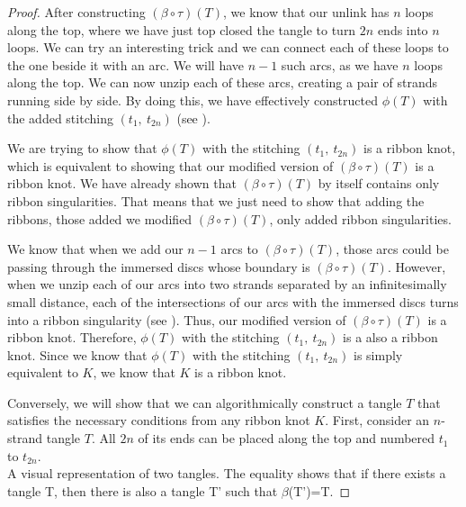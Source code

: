 \begin{paper}
\begin{proof}
After constructing $(\beta\circ\tau)(T)$, we know that our unlink has $n$ loops
along the top, where we have just top closed the tangle to turn $2n$ ends into
$n$ loops.
We can try an interesting trick and we can connect each of these loops to the
one beside it with an arc.
We will have $n-1$ such arcs, as we have $n$ loops along the top.
We can now unzip each of these arcs, creating a pair of strands running side by
side.
By doing this, we have effectively constructed $\phi(T)$ with the added
stitching $(t_1,~t_{2n})$ (see \figProof).

We are trying to show that $\phi(T)$ with the stitching $(t_1,~t_{2n})$ is a
ribbon knot, which is equivalent to showing that our modified version of
$(\beta\circ\tau)(T)$ is a ribbon knot.
We have already shown that $(\beta\circ\tau)(T)$ by itself contains only ribbon
singularities.
That means that we just need to show that adding the ribbons, those added we
modified $(\beta\circ\tau)(T)$, only added ribbon singularities.

We know that when we add our $n-1$ arcs to $(\beta\circ\tau)(T)$, those arcs
could be passing through the immersed discs whose boundary is
$(\beta\circ\tau)(T)$.
However, when we unzip each of our arcs into two strands separated by an
infinitesimally small distance, each of the intersections of our arcs with the
immersed discs turns into a ribbon singularity (see \figSingularities).
Thus, our modified version of $(\beta\circ\tau)(T)$ is a ribbon knot.
Therefore, $\phi(T)$ with the stitching $(t_1,~t_{2n})$ is a also a ribbon knot.
Since we know that $\phi(T)$ with the stitching $(t_1,~t_{2n})$ is simply
equivalent to $K$, we know that $K$ is a ribbon knot.

Conversely, we will show that we can algorithmically construct a tangle $T$
that satisfies the necessary conditions from any ribbon knot $K$.
First, consider an $n$-strand tangle $T$.
All $2n$ of its ends can be placed along the top and numbered $t_1$ to
$t_{2n}$.\\

{A visual representation of two tangles.
The equality shows that if there exists a tangle T, then there is also a tangle
T' such that $\beta$(T')=T.}


\end{proof}
\end{paper}
